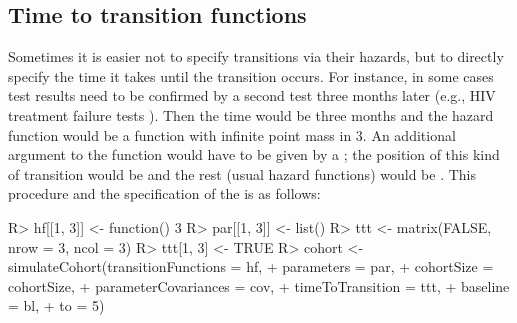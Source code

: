 \subsection{Time to transition functions}\label{subsec:ttt}
Sometimes it is easier not to specify transitions via their hazards, but to directly specify the time it takes until the transition occurs. For instance, in some cases test results need to be confirmed by a second test three months later (e.g., HIV treatment failure tests \citep{Estill2012}). Then the time would be three months and the hazard function would be a function with infinite point mass in 3. An additional argument  to the  function would have to be given by a ; the position of this kind of transition would be  and the rest (usual hazard functions) would be . This procedure and the specification of the  is as follows:
\begin{Schunk}
\begin{Sinput}
R>   hf[[1, 3]] <- function() 3
R>   par[[1, 3]] <- list()
R>   ttt <- matrix(FALSE, nrow = 3, ncol = 3)
R>   ttt[1, 3] <- TRUE
R>   cohort <- simulateCohort(transitionFunctions = hf, 
+                            parameters = par, 
+                            cohortSize = cohortSize, 
+                            parameterCovariances = cov, 
+                            timeToTransition = ttt,
+                            baseline = bl,
+                            to = 5)
\end{Sinput}
\end{Schunk}


